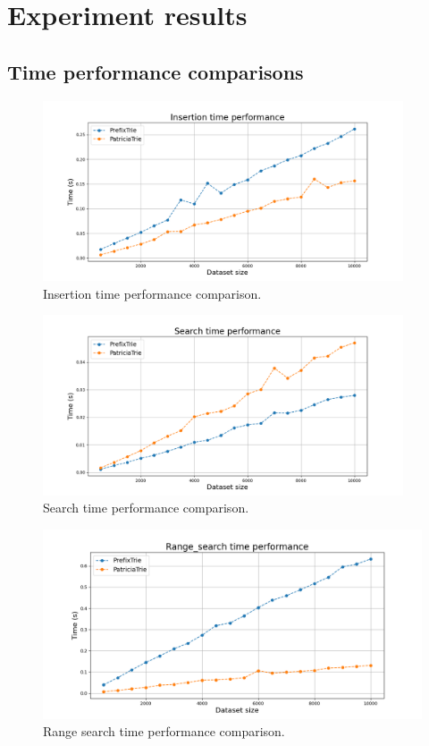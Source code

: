 \documentclass[essay]{fer}
\begin{document}
\chapter{Experiment results}
\label{chptr:experiment_results}

\section{Time performance comparisons}

\begin{figure}[H]
  \centering
  \includegraphics[width=0.95\textwidth]{Figures/insertion_time_performance.png}
  \caption{Insertion time performance comparison.}
  \label{fig:insertion_time}
\end{figure}

\begin{figure}[H]
  \centering
  \includegraphics[width=0.95\textwidth]{Figures/search_time_performance.png}
  \caption{Search time performance comparison.}
  \label{fig:search_time}
\end{figure}

\begin{figure}[H]
  \centering
  \includegraphics[width=1.00\textwidth]{Figures/range_search_time_performance.png}
  \caption{Range search time performance comparison.}
  \label{fig:range_search_time}
\end{figure}
\end{document}
